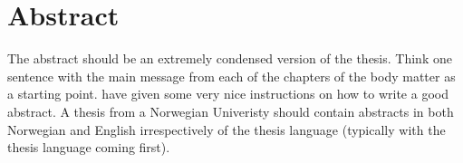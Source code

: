 \chapter*{Abstract}

The abstract should be an extremely condensed version of the thesis. Think one sentence with the main message from each of the chapters of the body matter as a starting point. have given some very nice instructions on how to write a good abstract. A thesis from a Norwegian Univeristy should contain abstracts in both Norwegian and English irrespectively of the thesis language (typically with the thesis language coming first).